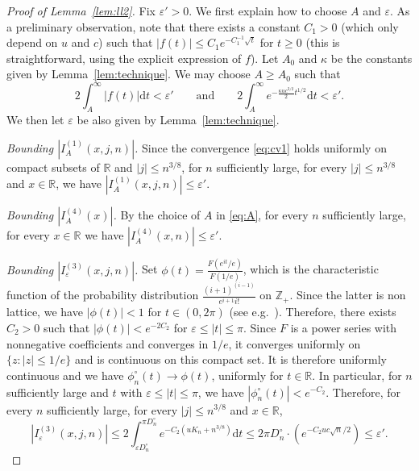 \documentclass[AHL,XML,longabstracts,Unicode]{cedram}
\newcommand{\Z}{\mathbb{Z}}
\newcommand{\R}{\mathbb{R}}
\def\phicn{\phi^{\circ}_{n}}
\def\Dcn{D^{\circ}_{n}}
\renewcommand{\epsilon}{\varepsilon}
\begin{document}
\begin{proof}[Proof of Lemma~\ref{lem:ll2}]
Fix $\epsilon'>0$. We first explain how to choose $A$ and $\epsilon$.
As a preliminary observation, note that there exists a constant $C_{1}>0$
(which only depend on $u$ and $c$) such that $|f(t)| \leq C_{1} e^{-C_{1}^{-1} \sqrt{t}}$ for $t \geq 0$
(this is straightforward, using the explicit expression of $f$).
Let $A_{0}$ and $\kappa$ be the constants given by Lemma~\ref{lem:technique}.
We may choose $A \geq A_{0}$ such that
\begin{equation}
\label{eq:A}2\int_{A}^{\infty} |f(t)|  \mathrm{d}t <\epsilon' \qquad \textrm{and} \qquad  2 \int_{A}^{\infty} e^{- \frac{\kappa u c^{3/2}}{2} t^{1/2}} \mathrm{d}t < \epsilon'.
\end{equation}
We then let $\epsilon$ be also given by Lemma~\ref{lem:technique}.






\emph{Bounding $|I^{(1)}_{A}(x,j,n)|$.} Since the convergence \eqref{eq:cv1} holds  uniformly on compact subsets of $\R$ and $|j| \leq n^{3/8}$, for   $n$ sufficiently large, for every $|j| \leq n^{3/8}$ and $x \in \R$, we have $|I^{(1)}_{A}(x,j,n)| \leq \epsilon'$.

\emph{Bounding $|I^{(4)}_{A}(x)|$.} By the choice of $A$ in \eqref{eq:A}, for every $n$ sufficiently large, for every $x \in \R$ we have $|I^{(4)}_{A}(x,n)| \leq \epsilon'$.

\emph{Bounding $|I^{(3)}_{\epsilon}(x,j,n)|$.}  Set $\phi(t)=\frac{F(e^{it}/e)}{F(1/e)}$, which is the characteristic function of  the probability distribution $ \frac{(i+1)^{(i-1)}}{e^{i+1} i!}$ on $\Z_{+}$. Since the latter is non lattice, we have $|\phi(t)|<1$ for $t \in (0,2\pi)$ (see e.g.~\cite[Theorem 3.5.1]{Dur10}).
Therefore, there exists $C_2>0$ such that $|\phi(t)|<e^{-2C_2}$ for $ \epsilon \leq |t| \leq \pi$.
Since $F$ is a power series with nonnegative coefficients and converges in $1/e$,
it converges uniformly on $\{z: |z| \le 1/e\}$ and is continuous on this compact set.
It is therefore uniformly continuous and
we have $\phicn(t) \rightarrow \phi(t)$, uniformly for $t \in \R$.
In particular, for $n$ sufficiently large and $t$ with $ \epsilon \leq |t| \leq \pi$,
we have $|\phicn(t)|<e^{-C_2}$.
 Therefore, for every $n$ sufficiently large, for every $|j| \leq n^{3/8}$ and  $x \in \R$,
 \[ \left|I^{(3)}_{\epsilon}(x,j,n) \right|  \leq 2 \int_{\epsilon \Dcn}^{\pi \Dcn} e^{-C_2 (uK_{n}  +n^{3/8})} \mathrm{d}t
 \leq 2 \pi \Dcn \cdot (e^{- C_2 u c \sqrt{n}/2} ) \le \epsilon'.\]


\end{proof}
\end{document}
